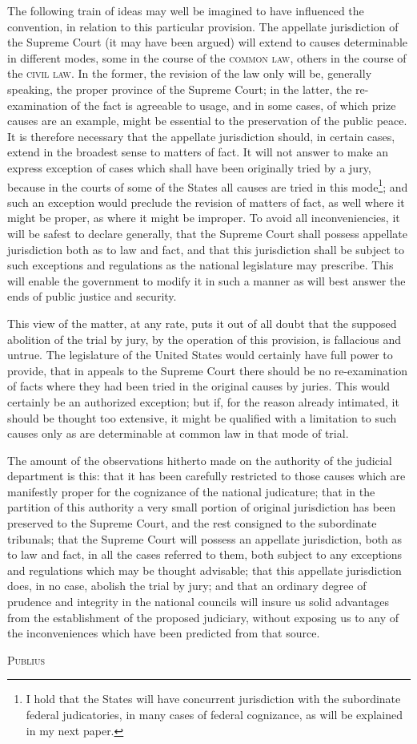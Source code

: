 The following train of ideas may well be imagined to have influenced the convention, in relation to this particular provision. The appellate jurisdiction of the Supreme Court (it may have been argued) will extend to causes determinable in different modes, some in the course of the \textsc{common law}, others in the course of the \textsc{civil law}. In the former, the revision of the law only will be, generally speaking, the proper province of the Supreme Court; in the latter, the re-examination of the fact is agreeable to usage, and in some cases, of which prize causes are an example, might be essential to the preservation of the public peace. It is therefore necessary that the appellate jurisdiction should, in certain cases, extend in the broadest sense to matters of fact. It will not answer to make an express exception of cases which shall have been originally tried by a jury, because in the courts of some of the States all causes are tried in this mode\footnote{I hold that the States will have concurrent jurisdiction with the subordinate federal judicatories, in many cases of federal cognizance, as will be explained in my next paper.}; and such an exception would preclude the revision of matters of fact, as well where it might be proper, as where it might be improper. To avoid all inconveniencies, it will be safest to declare generally, that the Supreme Court shall possess appellate jurisdiction both as to law and fact, and that this jurisdiction shall be subject to such exceptions and regulations as the national legislature may prescribe. This will enable the government to modify it in such a manner as will best answer the ends of public justice and security.

This view of the matter, at any rate, puts it out of all doubt that the supposed abolition of the trial by jury, by the operation of this provision, is fallacious and untrue. The legislature of the United States would certainly have full power to provide, that in appeals to the Supreme Court there should be no re-examination of facts where they had been tried in the original causes by juries. This would certainly be an authorized exception; but if, for the reason already intimated, it should be thought too extensive, it might be qualified with a limitation to such causes only as are determinable at common law in that mode of trial.

The amount of the observations hitherto made on the authority of the judicial department is this: that it has been carefully restricted to those causes which are manifestly proper for the cognizance of the national judicature; that in the partition of this authority a very small portion of original jurisdiction has been preserved to the Supreme Court, and the rest consigned to the subordinate tribunals; that the Supreme Court will possess an appellate jurisdiction, both as to law and fact, in all the cases referred to them, both subject to any exceptions and regulations which may be thought advisable; that this appellate jurisdiction does, in no case, abolish the trial by jury; and that an ordinary degree of prudence and integrity in the national councils will insure us solid advantages from the establishment of the proposed judiciary, without exposing us to any of the inconveniences which have been predicted from that source.

\vspace{.5cm}
\textsc{Publius}

\vspace{1.5cm}

